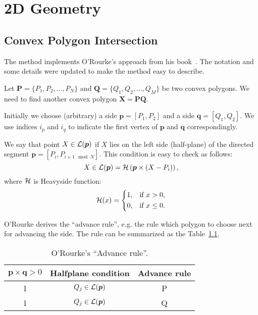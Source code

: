 
\chapter{2D Geometry}\label{ch:geometry2d}

\section{Convex Polygon Intersection}

The method implements O'Rourke's approach from his
book~\cite{bib:orourke}. The notation and some details were updated to
make the method easy to describe.

Let $\bm{P}=\{P_1,P_2,\dots,P_N\}$ and $\bm{Q}=\{Q_1,Q_2,\dots,Q_M\}$
be two convex polygons. We need to find another convex polygon
$\bm{X}=\bm{P}\bm{Q}$.

Initially we choose (arbitrary) a side $\bm{p}=[P_1,P_2]$ and a side
$\bm{q}=[Q_1,Q_2]$. We use indices $i_p$ and $i_q$ to indicate the
first vertex of $\bm{p}$ and $\bm{q}$ correspondingly. 

We say that point $X\in {\cal L}(\bm{p})$ if $X$ lies on the left side
(half-plane) of the directed segment $\bm{p}=[P_i,P_{i+1\mod N}]$. This
condition is easy to check as follows:
\begin{equation}
  X \in {\cal L}(\bm{p}) = {\cal H}\left( { \bm{p} \times (X-P_i)
  }\right),
\end{equation}
where ${\cal H}$ is Heavyside function:
\begin{equation}
  {\cal H}(x) = \left\{
  \begin{aligned}
    1, &\quad \text{if}\,\,x > 0,\\
    0, &\quad  \text{if}\,\,x \le 0.\\
  \end{aligned}\right.
\end{equation}

O'Rourke derives the ``advance rule'', e.g. the rule which polygon to
choose next for advancing the side. The rule can be summarized as the
Table~\ref{tab:arule}.
%
\begin{table}
  \center
  \caption{O'Rourke's ``Advance rule''.}
  \begin{tabular}{c|c|c}
    \hline
    $\bm{p}\times\bm{q} > 0$ & Halfplane condition & Advance rule \\
    \hline
    1 & $Q_j\in {\cal L}(\bm{p})$ & P \\
    1 & $Q_j\in {\cal L}(\bm{p})$ & Q \\
    \hline
  \end{tabular}
  \label{tab:arule}
\end{table}
